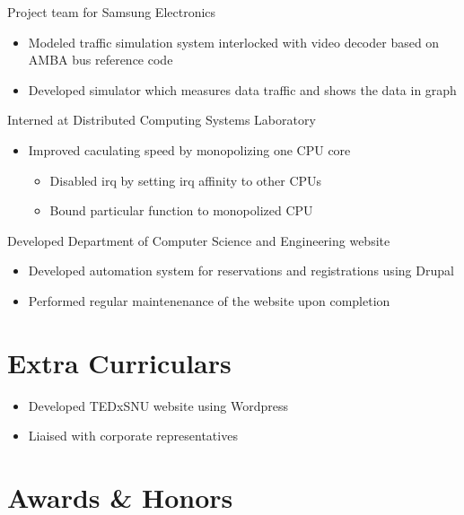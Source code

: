 \documentclass[11pt,a4paper,sans]{moderncv}        %
\begin{document}
{Project team for Samsung Electronics
  \begin{itemize}%
    \item Modeled traffic simulation system interlocked with video decoder based on AMBA bus reference code
    \item Developed simulator which measures data traffic and shows the data in graph
\end{itemize}}

{Interned at Distributed Computing Systems Laboratory
  \begin{itemize}%
    \item Improved caculating speed by monopolizing one CPU core
      \begin{itemize}
        \item Disabled irq by setting irq affinity to other CPUs
        \item Bound particular function to monopolized CPU
      \end{itemize}
\end{itemize}}

{Developed Department of Computer Science and Engineering website
  \begin{itemize}%
    \item Developed automation system for reservations and registrations using Drupal
    \item Performed regular maintenenance of the website upon completion
\end{itemize}}

\section{Extra Curriculars}
{\begin{itemize}%
    \item Developed TEDxSNU website using Wordpress
    \item Liaised with corporate representatives
\end{itemize}}

\section{Awards \& Honors}
\end{document}
